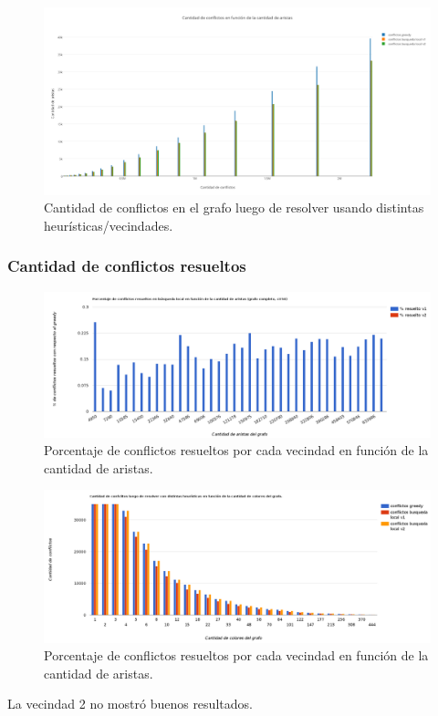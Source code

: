   \begin{figure}[]
	\centering
 	\includegraphics[width=18cm]{imagenes/Ej4/conflictosVsAristas.png}
	\caption{Cantidad de conflictos en el grafo luego de resolver usando distintas heurísticas/vecindades.}
	\label{conflictosEj4}
 \end{figure}
 


 
 
 
 \subsubsection{Cantidad de conflictos resueltos}
 
 \begin{figure}[H]
	\centering
 	\includegraphics[width=18cm]{imagenes/Ej4/porcentajeConflictosVsAristas.png}
	\caption{Porcentaje de conflictos resueltos por cada vecindad en función de la cantidad de aristas.}
	\label{conflictosEj4-porcentaje}
 \end{figure}
 
 
  \begin{figure}[H]
	\centering
 	\includegraphics[width=18cm]{imagenes/Ej4/conflictosVsColores.png}
	\caption{Porcentaje de conflictos resueltos por cada vecindad en función de la cantidad de aristas.}
	\label{conflictosEj4-porcentaje}
 \end{figure}
 La vecindad 2 no mostró buenos resultados. 